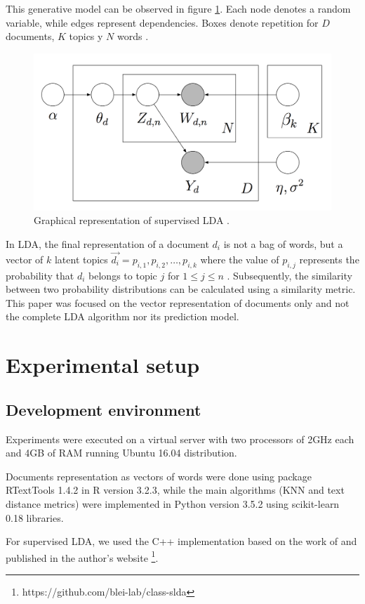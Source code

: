 \documentclass[preprint,12pt,3p]{elsarticle}
\begin{document}
This generative model can be observed in figure \ref{figure-sLDA}. Each node denotes a random variable, while edges represent dependencies. Boxes denote repetition for $D$ documents, $K$ topics y $N$ words \cite{srivastava2009text}.

\begin{figure}[h]
\caption{Graphical representation of supervised LDA \cite{mcauliffe2008supervised}.}
\label{figure-sLDA}
\includegraphics[width=\textwidth]{sLDA}
\end{figure}

In LDA, the final representation of a document ${d_{i}}$ is not a bag of words, but a vector of $k$ latent topics ${\vec{d_{i}}=p_{i,1}, p_{i,2},…, p_{i,k}}$ where the value of ${p_{i,j}}$ represents the probability that ${d_{i}}$ belongs to topic $j$ for ${1 \leq  j \leq  n}$ \cite{ bae2014computing, aggarwal2015data}. Subsequently, the similarity between two probability distributions can be calculated using a similarity metric. This paper was focused on the vector representation of documents only and not the complete LDA algorithm nor its prediction model.


\section{Experimental setup}
\label{experimental_setup}

\subsection{Development environment}

Experiments were executed on a virtual server with two processors of 2GHz each and 4GB of RAM running Ubuntu 16.04 distribution.\par
Documents representation as vectors of words were done using package RTextTools 1.4.2 in R version 3.2.3, while the main algorithms (KNN and text distance metrics) were implemented in Python version 3.5.2 using scikit-learn 0.18 libraries.\par
For supervised LDA, we used the C++ implementation based on the work of \cite{mcauliffe2008supervised} and published in the author's website \footnote{https://github.com/blei-lab/class-slda}.
\end{document}
